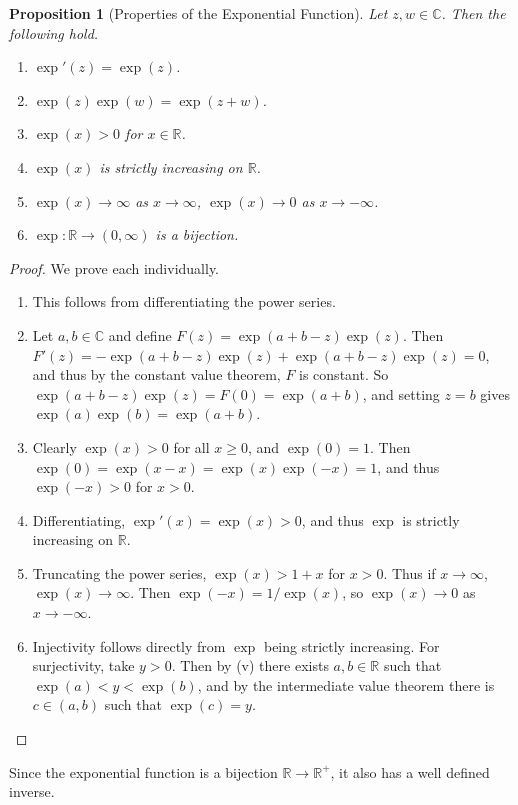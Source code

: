 \documentclass[11pt, a4paper]{article}
\newtheorem{proposition}[theorem]{Proposition}
\theoremstyle{definition}
\newcommand{\C}{\mathbb{C}}
\newcommand{\R}{\mathbb{R}}
\begin{document}
\begin{proposition}[Properties of the Exponential Function]\label{prop:exp}
	Let $z, w \in \C$. Then the following hold.
	\begin{enumerate}[label=(\roman*)]
		\item $\exp'(z) = \exp(z)$.
		\item $\exp(z)\exp(w) = \exp(z + w)$.
		\item $\exp(x) > 0$ for $x \in \R$.
		\item $\exp(x)$ is strictly increasing on $\R$.
		\item $\exp(x) \rightarrow \infty$ as $x \rightarrow \infty$, $\exp(x) \rightarrow 0$ as $x \rightarrow -\infty$.
		\item $\exp: \R \rightarrow (0, \infty)$ is a bijection.
	\end{enumerate}
\end{proposition}
\begin{proof}
	We prove each individually.
	\begin{enumerate}[label=(\roman*)]
		\item This follows from differentiating the power series.
		\item Let $a, b \in \C$ and define $F(z) = \exp(a + b - z)\exp(z)$. Then $F'(z) = -\exp(a + b - z)\exp(z) + \exp(a + b - z)\exp(z) = 0$, and thus by the constant value theorem, $F$ is constant. So $\exp(a + b - z)\exp(z) = F(0) = \exp(a +  b)$, and setting $z = b$ gives $\exp(a) \exp(b) = \exp(a + b)$.
		\item Clearly $\exp(x) > 0$ for all $x \geq 0$, and $\exp(0) = 1$. Then $\exp(0) = \exp(x - x) = \exp(x) \exp(-x) = 1$, and thus $\exp(-x) > 0$ for $x > 0$.
		\item Differentiating, $\exp'(x) = \exp(x) > 0$, and thus $\exp$ is strictly increasing on $\R$.
		\item Truncating the power series, $\exp(x) > 1 + x$ for $x > 0$. Thus if $x \rightarrow \infty$, $\exp(x) \rightarrow \infty$. Then $\exp(-x) = 1/\exp (x)$, so $\exp(x) \rightarrow 0$ as $x \rightarrow - \infty$.
		\item Injectivity follows directly from $\exp$ being strictly increasing. For surjectivity, take $y > 0$. Then by (v) there exists $a, b \in \R$ such that $\exp(a) < y < \exp(b)$, and by the intermediate value theorem there is $c \in (a, b)$ such that $\exp(c) = y$. \qedhere
	\end{enumerate}
\end{proof}

Since the exponential function is a bijection $\R \rightarrow \R^+$, it also has a well defined inverse.
\end{document}
